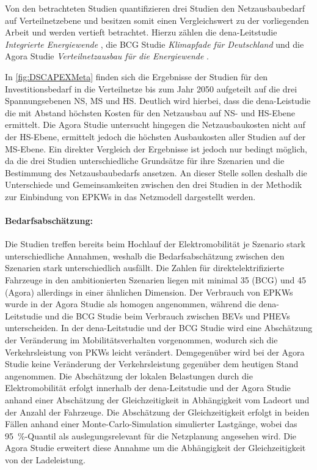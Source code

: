 Von den betrachteten Studien quantifizieren drei Studien den Netzausbaubedarf auf Verteilnetzebene und besitzen somit einen Vergleichswert zu der vorliegenden Arbeit und werden vertieft betrachtet.
Hierzu zählen die dena-Leitstudie \textit{Integrierte Energiewende} \cite{DEAGH2018}, die BCG Studie \textit{Klimapfade für Deutschland} \cite{BCG2018} und die Agora Studie \textit{Verteilnetzausbau für die Energiewende} \cite{Agora2019}.



In \autoref{fig:DSCAPEXMeta} finden sich die Ergebnisse der Studien für den Investitionsbedarf in die Verteilnetze bis zum Jahr \num{2050} aufgeteilt auf die drei Spannungsebenen \gls{NS}, \gls{MS} und \gls{HS}.
Deutlich wird hierbei, dass die dena-Leistudie die mit Abstand höchsten Kosten für den Netzausbau auf \gls{NS}- und \gls{HS}-Ebene ermittelt.
Die Agora Studie untersucht hingegen die Netzausbaukosten nicht auf der \gls{HS}-Ebene, ermittelt jedoch die höchsten Ausbaukosten aller Studien auf der \gls{MS}-Ebene.
Ein direkter Vergleich der Ergebnisse ist jedoch nur bedingt möglich, da die drei Studien unterschiedliche Grundsätze für ihre Szenarien und die Bestimmung des Netzausbaubedarfs ansetzen.
An dieser Stelle sollen deshalb die Unterschiede und Gemeinsamkeiten zwischen den drei Studien in der Methodik zur Einbindung von \glspl{EPKW} in das Netzmodell dargestellt werden.


\paragraph{Bedarfsabschätzung:}

Die Studien treffen bereits beim Hochlauf der Elektromobilität je Szenario stark unterschiedliche Annahmen, weshalb die Bedarfsabschätzung zwischen den Szenarien stark unterschiedlich ausfällt.
Die Zahlen für direktelektrifizierte Fahrzeuge in den ambitionierten Szenarien liegen mit minimal \SI{35}{\MioFZs} (BCG) und \SI{45}{\MioFZs} (Agora) allerdings in einer ähnlichen Dimension.
Der Verbrauch von \glspl{EPKW} wurde in der Agora Studie als homogen angenommen, während die dena-Leitstudie und die BCG Studie beim Verbrauch zwischen \glspl{BEV} und \glspl{PHEV} unterscheiden.
In der dena-Leitstudie und der BCG Studie wird eine Abschätzung der Veränderung im Mobilitätsverhalten vorgenommen, wodurch sich die Verkehrsleistung von \glspl{PKW} leicht verändert.
Demgegenüber wird bei der Agora Studie keine Veränderung der Verkehrsleistung gegenüber dem heutigen Stand angenommen.
Die Abschätzung der lokalen Belastungen durch die Elektromobilität erfolgt innerhalb der dena-Leitstudie und der Agora Studie anhand einer Abschätzung der Gleichzeitigkeit in Abhängigkeit vom Ladeort und der Anzahl der Fahrzeuge.
Die Abschätzung der Gleichzeitigkeit erfolgt in beiden Fällen anhand einer Monte-Carlo-Simulation simulierter Lastgänge, wobei das \SI{95}{\percent}-Quantil als auslegungsrelevant für die Netzplanung angesehen wird.
Die Agora Studie erweitert diese Annahme um die Abhängigkeit der Gleichzeitigkeit von der Ladeleistung.


